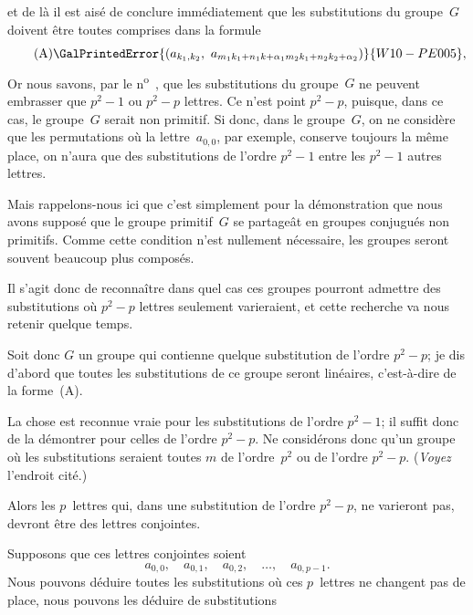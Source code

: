 et de là il est aisé de conclure immédiatement que les substitutions
du groupe~$G$ doivent être toutes comprises dans la formule
\[
\tag{A}
\GalPrintedError{(a_{k_{1}, k_{2}},\ a_{m_{1} k_{1} + n_{1} k + \alpha_{1} m_{2} k_{1} + n_{2} k_{2} + \alpha_{2}})}{W10-PE005},
\]
Or nous savons, par le n\textsuperscript{o}~\GalHistoricalFootnoteMark{*},
que les substitutions du groupe~$G$
ne peuvent embrasser que $p^{2} - 1$ ou $p^{2} - p$ lettres. Ce n'est
point $p^{2} - p$, puisque, dans ce cas, le groupe~$G$ serait non primitif.
Si donc, dans le groupe~$G$, on ne considère que les permutations
où la lettre~$a_{0,0}$, par exemple, conserve toujours la même
place, on n'aura que des substitutions de l'ordre $p^{2} - 1$ entre les
$p^{2} - 1$ autres lettres.

Mais rappelons-nous ici que c'est simplement pour la démonstration
que nous avons supposé que le groupe primitif~$G$ se partageât
en groupes conjugués non primitifs. Comme cette condition
n'est nullement nécessaire, les groupes seront souvent beaucoup
plus composés.

Il s'agit donc de reconnaître dans quel cas ces groupes pourront
admettre des substitutions où $p^{2} - p$ lettres seulement varieraient,
et cette recherche va nous retenir quelque temps.

Soit donc $G$ un groupe qui contienne quelque substitution de
l'ordre $p^{2} - p$; je dis d'abord que toutes les substitutions de ce
groupe seront linéaires, c'est-à-dire de la forme~\textup{(A)}.

La chose est reconnue vraie pour les substitutions de l'ordre
$p^{2} - 1$; il suffit donc de la démontrer pour celles de l'ordre
$p^{2} - p$. Ne considérons donc qu'un groupe où les substitutions
seraient toutes $m$ de l'ordre~$p^{2}$ ou de l'ordre $p^{2} - p$. (\emph{Voyez} l'endroit
cité.)

Alors les $p$~lettres qui, dans une substitution de l'ordre $p^{2} - p$,
ne varieront pas, devront être des lettres conjointes.

Supposons que ces lettres conjointes soient
\[
a_{0,0},\quad a_{0,1},\quad a_{0,2},\quad \dots, \quad a_{0,p-1}.
\]
Nous pouvons déduire toutes les substitutions où ces $p$~lettres ne
changent pas de place, nous pouvons les déduire de substitutions
